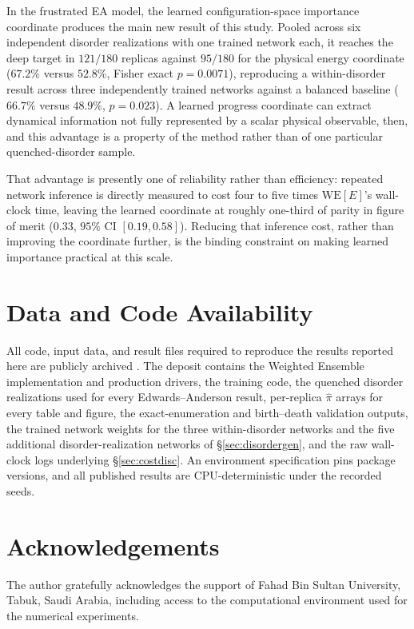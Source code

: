 \documentclass[a4paper,fleqn]{cas-sc}
\newcommand{\WE}{\mathrm{WE}}
\begin{document}
In the frustrated EA model, the learned configuration-space importance coordinate produces the
main new result of this study. Pooled across six independent disorder realizations with one
trained network each, it reaches the deep target in $121/180$ replicas against $95/180$ for the
physical energy coordinate ($67.2\%$ versus $52.8\%$, Fisher exact $p=0.0071$), reproducing a
within-disorder result across three independently trained networks against a balanced baseline
($66.7\%$ versus $48.9\%$, $p=0.023$). A learned progress coordinate can extract dynamical
information not fully represented by a scalar physical observable, then, and this advantage is
a property of the method rather than of one particular quenched-disorder sample.

That advantage is presently one of reliability rather than efficiency: repeated network
inference is directly measured to cost four to five times $\WE[E]$'s wall-clock time, leaving
the learned coordinate at roughly one-third of parity in figure of merit ($0.33$, $95\%$ CI
$[0.19,0.58]$). Reducing that inference cost, rather than improving the coordinate further, is
the binding constraint on making learned importance practical at this scale.

\section*{Data and Code Availability}
All code, input data, and result files required to reproduce the results reported here are
publicly archived \citep{dataset}. The deposit contains the Weighted Ensemble implementation
and production drivers, the training code, the quenched disorder realizations used for every
Edwards--Anderson result, per-replica $\hat\pi$ arrays for every table and figure, the
exact-enumeration and birth--death validation outputs, the trained network weights for the
three within-disorder networks and the five additional disorder-realization networks of
\S\ref{sec:disordergen}, and the raw wall-clock logs underlying \S\ref{sec:costdisc}. An
environment specification pins package versions, and all published results are
CPU-deterministic under the recorded seeds.

\section*{Acknowledgements}
The author gratefully acknowledges the support of Fahad Bin Sultan University, Tabuk, Saudi
Arabia, including access to the computational environment used for the numerical experiments.
\end{document}
